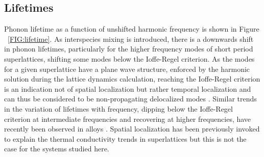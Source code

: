 \documentclass[aps,prb,preprint,preprintnumbers,amsmath,amssymb,floatfix,superscriptaddress]{revtex4}
\begin{document}


\subsection{Lifetimes}

Phonon lifetime as a function of unshifted harmonic frequency is shown in Figure ~\ref{FIG:lifetime}. As interspecies mixing is introduced, there is a downwards shift in phonon lifetimes, particularly for the higher frequency modes of short period superlattices, shifting some modes below the Ioffe-Regel criterion. As the modes for a given superlattice have a plane wave structure, enforced by the harmonic solution during the lattice dynamics calculation, reaching the Ioffe-Regel criterion is an indication not of spatial localization but rather temporal localization and can thus be considered to be non-propagating delocalized modes \cite{allen_thermal_1993}. Similar trends in the variation of lifetimes with frequency, dipping below the Ioffe-Regel criterion at intermediate frequencies and recovering at higher frequencies, have recently been observed in alloys \cite{jason2013vc}. Spatial localization has been previously invoked to explain the thermal conductivity trends in superlattices \cite{PhysRevB.61.3091} but this is not the case for the systems studied here.
\end{document}
